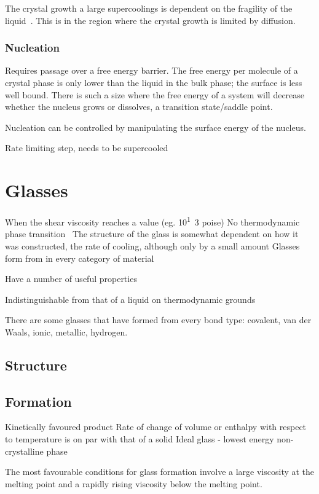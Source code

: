 The crystal growth a large supercoolings is dependent on the fragility of the liquid~\cite{ediger:08}. This is in the region where the crystal growth is limited by diffusion. 


\subsubsection{Nucleation}
Requires passage over a free energy barrier. The free energy per molecule of a crystal phase is only lower than the liquid in the bulk phase; the surface is less well bound. There is such a size where the free energy of a system will decrease whether the nucleus grows or dissolves, a transition state/saddle point.

Nucleation can be controlled by manipulating the surface energy of the nucleus.~\cite{de-yoreo:03}
 
Rate limiting step, needs to be supercooled
 
\section{Glasses}
When the shear viscosity reaches a value (eg. \si{10^13} poise)
No thermodynamic phase transition~\cite{santen:00}
The structure of the glass is somewhat dependent on how it was constructed, the rate of cooling, although only by a small amount
Glasses form from in every category of material~\cite{turnbull:69}

Have a number of useful properties~\cite{greer:07}

Indistinguishable from that of a liquid on thermodynamic grounds~\cite{santen:00}

There are some glasses that have formed from every bond type: covalent, van der Waals, ionic, metallic, hydrogen.~\cite{turnbull:69}

\subsection{Structure}


\subsection{Formation}
Kinetically favoured product
Rate of change of volume or enthalpy with respect to temperature is on par with that of a solid
Ideal glass - lowest energy non-crystalline phase

The most favourable conditions for glass formation involve a large viscosity at the melting point and a rapidly rising viscosity below the melting point.~\cite{uhlmann:72}



